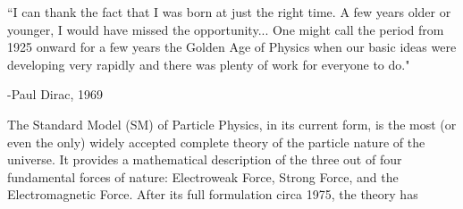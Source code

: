 \vspace{1in}
{\large
``I can thank the fact that I was born at just the right time. A few years older or younger, I would have missed the opportunity... One might call the period from 1925 onward for a few years the Golden Age of Physics when our basic ideas were developing very rapidly and there was plenty of work for everyone to do."

\hfill -Paul Dirac, 1969}
\vspace{1in}

The Standard Model (SM) of Particle Physics, in its current form, is the most (or even the only) widely accepted complete theory of the particle nature of the universe. It provides a mathematical description of the three out of four fundamental forces of nature: Electroweak Force, Strong Force, and the Electromagnetic Force. After its full formulation circa 1975, the theory has 